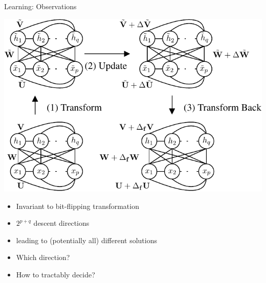 \documentclass{beamer}
\begin{document}
\begin{frame}{Learning: Observations}
    \begin{minipage}{0.59\textwidth}
        \begin{center}
            \includegraphics[width=\textwidth]{transf.pdf}
        \end{center}
    \end{minipage}
    \hfill
    \begin{minipage}{0.4\textwidth}
        \small 
        \begin{itemize}
            \item Invariant to bit-flipping transformation
            \item $2^{p+q}$ descent directions 
            \item leading to (potentially all) different solutions
            \item Which direction?
            \item How to tractably decide?
        \end{itemize}
    \end{minipage}
\end{frame}
\end{document}
